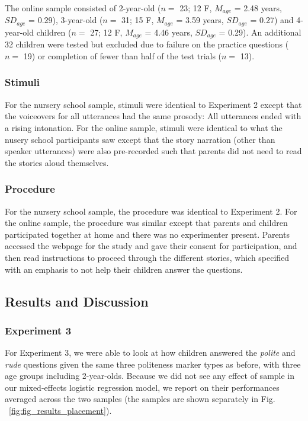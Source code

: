 \documentclass[10pt, letterpaper]{article}
\begin{document}
The online sample consisted of 2-year-old (\(n=\) 23; 12 F, \(M_{age}\)
= 2.48 years, \(SD_{age}\) = 0.29), 3-year-old (\(n=\) 31; 15 F,
\(M_{age}\) = 3.59 years, \(SD_{age}\) = 0.27) and 4-year-old children
(\(n=\) 27; 12 F, \(M_{age}\) = 4.46 years, \(SD_{age}\) = 0.29). An
additional 32 children were tested but excluded due to failure on the
practice questions (\(n=\) 19) or completion of fewer than half of the
test trials (\(n=\) 13).

\subsubsection{Stimuli}\label{stimuli}

For the nursery school sample, stimuli were identical to Experiment 2
except that the voiceovers for all utterances had the same prosody: All
utterances ended with a rising intonation. For the online sample,
stimuli were identical to what the nusery school participants saw except
that the story narration (other than speaker utterances) were also
pre-recorded such that parents did not need to read the stories aloud
themselves.

\subsubsection{Procedure}\label{procedure-2}

For the nursery school sample, the procedure was identical to Experiment
2. For the online sample, the procedure was similar except that parents
and children participated together at home and there was no experimenter
present. Parents accessed the webpage for the study and gave their
consent for participation, and then read instructions to proceed through
the different stories, which specified with an emphasis to not help
their children answer the questions.

\subsection{Results and Discussion}\label{results-and-discussion-2}

\subsubsection{Experiment 3}\label{experiment-3-1}

For Experiment 3, we were able to look at how children answered the
\emph{polite} and \emph{rude} questions given the same three politeness
marker types as before, with three age groups including 2-year-olds.
Because we did not see any effect of sample in our mixed-effects
logistic regression model, we report on their performances averaged
across the two samples (the samples are shown separately in Fig.
~\ref{fig:fig_results_placement}).
\end{document}
